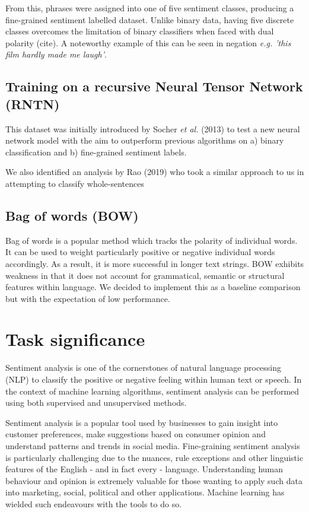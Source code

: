\documentclass[10pt, a4paper]{article}
\begin{document}
From this, phrases were assigned into one of five sentiment classes, producing a fine-grained sentiment labelled dataset. Unlike binary data, having five discrete classes overcomes the limitation of binary classifiers when faced with dual polarity (cite). A noteworthy example of this can be seen in negation \textit{e.g. 'this film hardly made me laugh'}. 

\subsection{Training on a recursive Neural Tensor Network (RNTN)}
This dataset was initially introduced by Socher \textit{et al.} (2013) to test a new neural network model with the aim to outperform previous algorithms on a) binary classification and b) fine-grained sentiment labels.

We also identified an analysis by Rao (2019) who took a similar approach to us in attempting to classify whole-sentences

\subsection{Bag of words (BOW)}
Bag of words is a popular method which tracks the polarity of individual words. It can be used to weight particularly positive or negative individual words accordingly. As a result, it is more successful in longer text strings. BOW exhibits weakness in that it does not account for grammatical, semantic or structural features within language. We decided to implement this as a baseline comparison but with the expectation of low performance.



\section{Task significance}

Sentiment analysis is one of the cornerstones of natural language processing (NLP) to classify the positive or negative feeling within human text or speech. In the context of machine learning algorithms, sentiment analysis can be performed using both supervised and unsupervised methods. 

Sentiment analysis is a popular tool used by businesses to gain insight into customer preferences, make suggestions based on consumer opinion and understand patterns and trends in social media. Fine-graining sentiment analysis is particularly challenging due to the nuances, rule exceptions and other linguistic features of the English - and in fact every - language. Understanding human behaviour and opinion is extremely valuable for those wanting to apply such data into marketing, social, political and other applications. Machine learning has wielded such endeavours with the tools to do so.
\end{document}

